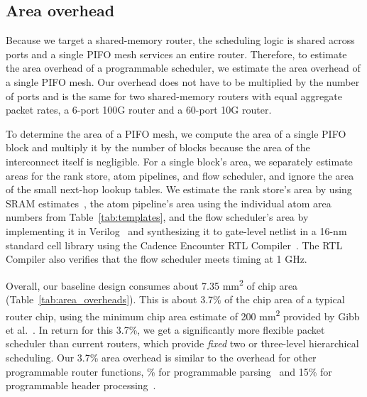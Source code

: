 \subsection{Area overhead}
\label{ss:feasibility}

Because we target a shared-memory router, the scheduling logic is shared
across ports and a single PIFO mesh services an entire router. Therefore, to
estimate the area overhead of a programmable scheduler, we estimate the area
overhead of a single PIFO mesh. Our overhead does not have to be multiplied by
the number of ports and is the same for two shared-memory routers with equal
aggregate packet rates, \eg a 6-port 100G router and a 60-port 10G router.

To determine the area of a PIFO mesh, we compute the area of a single PIFO
block and multiply it by the number of blocks because the area of the
interconnect itself is negligible.  For a single block's area, we separately
estimate areas for the rank store, atom pipelines, and flow scheduler, and
ignore the area of the small next-hop lookup tables.  We estimate the rank
store's area by using SRAM estimates~\cite{sram_estimate}, the atom pipeline's
area using the individual atom area numbers from Table~\ref{tab:templates}, and
the flow scheduler's area by implementing it in Verilog~\cite{system_verilog}
and synthesizing it to gate-level netlist in a 16-nm standard cell library
using the Cadence Encounter RTL Compiler~\cite{cadence_rc}. The RTL Compiler
also verifies that the flow scheduler meets timing at 1 GHz.

Overall, our baseline design consumes about 7.35 \si{\milli\metre\squared} of
chip area (Table~\ref{tab:area_overheads}). This is about 3.7\% of the chip
area of a typical router chip, using the minimum chip area estimate of 200
\si{\milli\metre\squared} provided by Gibb et al.~\cite{glen_parsing}. In
return for this 3.7\%, we get a significantly more flexible packet scheduler
than current routers, which provide {\em fixed} two or three-level hierarchical
scheduling. Our 3.7\% area overhead is similar to the overhead for other
programmable router functions, \% for programmable
parsing~\cite{glen_parsing} and 15\% for programmable header
processing~\cite{rmt}.
 
